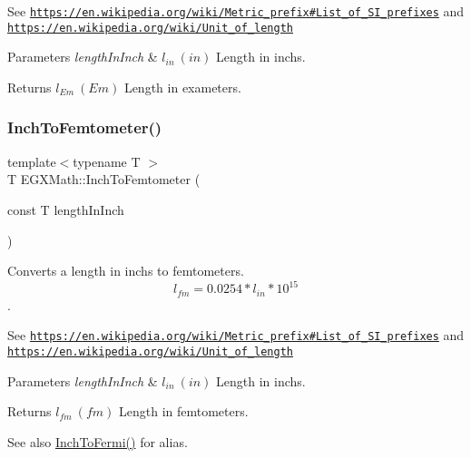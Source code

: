 See \href{https://en.wikipedia.org/wiki/Metric_prefix#List_of_SI_prefixes}{\tt https\+://en.\+wikipedia.\+org/wiki/\+Metric\+\_\+prefix\#\+List\+\_\+of\+\_\+\+S\+I\+\_\+prefixes} and \href{https://en.wikipedia.org/wiki/Unit_of_length}{\tt https\+://en.\+wikipedia.\+org/wiki/\+Unit\+\_\+of\+\_\+length} 
\begin{DoxyParams}{Parameters}
{\em length\+In\+Inch} & $ l_{in}\ (in)$ Length in inchs. \\
\hline
\end{DoxyParams}
\begin{DoxyReturn}{Returns}
$ l_{Em}\ (Em)$ Length in exameters. 
\end{DoxyReturn}
\mbox{\label{group___e_g_x_math-_conversions-_length_conversions-_imperial-_inch-_s_i_gaef29e83d5736f037b666310a5f08db43}} 
\subsubsection{\texorpdfstring{Inch\+To\+Femtometer()}{InchToFemtometer()}}
{\footnotesize\ttfamily template$<$typename T $>$ \\
T E\+G\+X\+Math\+::\+Inch\+To\+Femtometer (\begin{DoxyParamCaption}\item[{const T}]{length\+In\+Inch }\end{DoxyParamCaption})}



Converts a length in inchs to femtometers. \[ l_{fm}=0.0254 * l_{in} * 10^{15} \]. 

See \href{https://en.wikipedia.org/wiki/Metric_prefix#List_of_SI_prefixes}{\tt https\+://en.\+wikipedia.\+org/wiki/\+Metric\+\_\+prefix\#\+List\+\_\+of\+\_\+\+S\+I\+\_\+prefixes} and \href{https://en.wikipedia.org/wiki/Unit_of_length}{\tt https\+://en.\+wikipedia.\+org/wiki/\+Unit\+\_\+of\+\_\+length} 
\begin{DoxyParams}{Parameters}
{\em length\+In\+Inch} & $ l_{in}\ (in)$ Length in inchs. \\
\hline
\end{DoxyParams}
\begin{DoxyReturn}{Returns}
$ l_{fm}\ (fm)$ Length in femtometers. 
\end{DoxyReturn}
\begin{DoxySeeAlso}{See also}
\mbox{\hyperlink{group___e_g_x_math-_conversions-_length_conversions-_imperial-_inch-_non-_s_i_ga60087eace30a405617328d7c3ac3efb3}{Inch\+To\+Fermi()}} for alias. 
\end{DoxySeeAlso}
\mbox{\label{group___e_g_x_math-_conversions-_length_conversions-_imperial-_inch-_s_i_gaf273646afbc5959590e89febab1a04ec}} 
